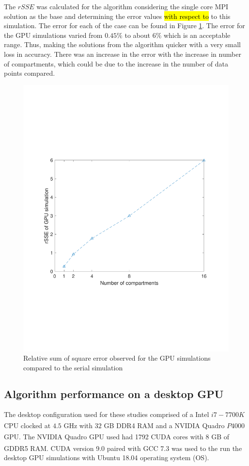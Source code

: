 \documentclass[review]{elsarticle}
\begin{document}
\begin{linenumbers}
The $rSSE$ was calculated for the algorithm considering the single core MPI 
solution as the base and determining the error values \hl{with respect to} to this simulation.
The error for each of the case can be found in Figure \ref{fig:res_gpu_error}. The error 
for the GPU simulations varied from $0.45\%$ to about $6\%$ which is an acceptable 
range. Thus, making the solutions from the algorithm quicker with a very small 
loss in accuracy. There was an increase in the error with the increase in number 
of compartments, which could be due to the increase in the number of data points compared. 

\begin{figure}[H]
\centering
\includegraphics[scale=0.7,trim=50 180 50 200, clip]{Figure_3.pdf}
\caption{Relative sum of square error observed for the GPU simulations compared to 
the serial simulation}
\label{fig:res_gpu_error}
\end{figure}


\subsection{Algorithm performance on a desktop GPU}
The desktop configuration used for these studies comprised of a Intel $i7-7700K$  
CPU clocked at $4.5$ GHz with $32$ GB DDR4 RAM and a 
NVIDIA\textsuperscript{\tiny\textregistered} Quadro $P4000$ GPU. 
The NVIDIA\textsuperscript{\tiny\textregistered} Quadro GPU used had 1792 
CUDA\textsuperscript{\tiny\textregistered} cores with 8 GB of GDDR5 RAM. 
CUDA\textsuperscript{\tiny\textregistered} version 9.0 paired with GCC 7.3 was 
used to the run the desktop GPU simulations with Ubuntu 18.04 operating system (OS).


\end{linenumbers}
\end{document}
